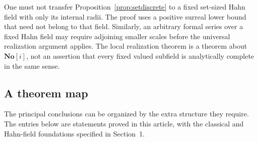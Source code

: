 \documentclass[11pt,a4paper]{article}
\theoremstyle{definition}\newtheorem{definition}[theorem]{Definition}
\theoremstyle{remark}\newtheorem{remark}[theorem]{Remark}
\newcommand{\No}{\mathbf{No}}
\numberwithin{equation}{section}
\begin{document}
One must not transfer Proposition~\ref{prop:setdiscrete} to a fixed set-sized Hahn field with only its internal radii. The proof uses a positive surreal lower bound that need not belong to that field. Similarly, an arbitrary formal series over a fixed Hahn field may require adjoining smaller scales before the universal realization argument applies. The local realization theorem is a theorem about $\No[i]$, not an assertion that every fixed valued subfield is analytically complete in the same sense.

\subsection{A theorem map}
The principal conclusions can be organized by the extra structure they require. The entries below are statements proved in this article, with the classical and Hahn-field foundations specified in Section~1.
\end{document}
